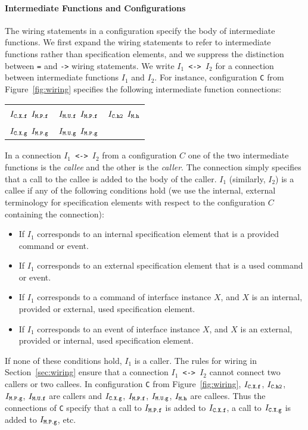 \documentclass[11pt,letterpaper]{article}
\newcommand{\code}[1]{{\tt #1}}
\begin{document}
\paragraph{Intermediate Functions and Configurations}

The wiring statements in a configuration specify the body of intermediate
functions. We first expand the wiring statements to refer to intermediate
functions rather than specification elements, and we suppress the
distinction between \code{=} and \code{->} wiring statements. We write
\code{$I_1$ <-> $I_2$} for a connection between intermediate functions
\code{$I_1$} and \code{$I_2$}. For instance, configuration \code{C} from
Figure~\ref{fig:wiring} specifies the following intermediate function
connections:\\
\begin{tabular}{ccc}
$I_\code{C.X.f}$ \code{<->} $I_\code{M.P.f}$ & 
$I_\code{M.U.f}$ \code{<->} $I_\code{M.P.f}$ & 
$I_\code{C.h2}$ \code{<->} $I_\code{M.h}$ \\
$I_\code{C.X.g}$ \code{<->} $I_\code{M.P.g}$ & 
$I_\code{M.U.g}$ \code{<->} $I_\code{M.P.g}$
\end{tabular}

In a connection \code{$I_1$ <-> $I_2$} from a configuration
$C$ one of the two intermediate functions is the \emph{callee} and the
other is the \emph{caller}. The connection simply specifies that a call to
the callee is added to the body of the caller. \code{$I_1$}
(similarly, \code{$I_2$}) is a callee if any of the following conditions hold
(we use the internal, external terminology for specification elements with
respect to the configuration $C$ containing the connection):
\begin{itemize}
\item If \code{$I_1$} corresponds to an internal specification element that
is a provided command or event.
\item If \code{$I_1$} corresponds to an external specification element that
is a used command or event.
\item If \code{$I_1$} corresponds to a command of interface instance $X$,
and $X$ is an internal, provided or external, used specification element.
\item If \code{$I_1$} corresponds to an event of interface instance $X$,
and $X$ is an external, provided or internal, used specification element.
\end{itemize}
If none of these conditions hold, \code{$I_1$} is a caller. The rules for
wiring in Section~\ref{sec:wiring} ensure that a connection \code{$I_1$ <->
$I_2$} cannot connect two callers or two callees. In configuration \code{C}
from Figure~\ref{fig:wiring}, $I_\code{C.X.f}$, $I_\code{C.h2}$,
$I_\code{M.P.g}$, $I_\code{M.U.f}$ are callers and $I_\code{C.X.g}$,
$I_\code{M.P.f}$, $I_\code{M.U.g}$, $I_\code{M.h}$ are callees. Thus the
connections of \code{C} specify that a call to $I_\code{M.P.f}$ is added to
$I_\code{C.X.f}$, a call to $I_\code{C.X.g}$ is added to $I_\code{M.P.g}$,
etc.
\end{document}
